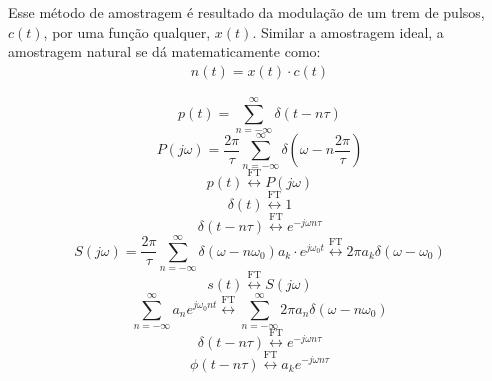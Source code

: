 Esse método de amostragem é resultado da modulação de um trem de pulsos, $c(t)$, por uma função qualquer, $x(t)$. Similar a amostragem ideal, a amostragem natural se dá matematicamente como:
\begin{align}
    n(t) = x(t) \cdot c(t)
\end{align}


\begin{equation}
    p(t) = \sum_{n=-\infty}^{\infty} \delta(t - n\tau)    
\end{equation}
    \begin{equation}
    P(j\omega) = \frac{2\pi}{\tau} \sum_{n=-\infty}^{\infty} \delta(\omega - n\frac{2\pi}{\tau})    
    \end{equation}
    \begin{equation}
    p(t) \overset{\text{FT}}{\longleftrightarrow} P(j\omega)     
    \end{equation}
    \begin{equation}
    \delta(t) \overset{\text{FT}}{\longleftrightarrow} 1        
    \end{equation}
    \begin{equation}
    \delta(t - n\tau) \overset{\text{FT}}{\longleftrightarrow} e^{-j\omega n \tau}        
    \end{equation}
    \begin{equation}
        S(j\omega) = \frac{2\pi}{\tau} \sum_{n=-\infty}^{\infty} \delta(\omega - n\omega_{0}) a_{k} \cdot e^{j\omega_{0}t} \overset{\text{FT}}{\longleftrightarrow} 2\pi a_{k}\delta(\omega-\omega_{0})
    \end{equation}
    \begin{equation}       
    s(t)\overset{\text{FT}}{\longleftrightarrow}S(j\omega)
    \end{equation}
    \begin{equation}
    \sum_{n=-\infty}^{\infty} a_{n}e^{j\omega_{0}nt} \overset{\text{FT}}{\longleftrightarrow} \sum_{n=-\infty}^{\infty} 2\pi a_{n}\delta(\omega-n\omega_{0})
            \end{equation}
            \begin{equation}
    \delta(t-n\tau) \overset{\text{FT}}{\longleftrightarrow} e^{-j\omega n\tau}              
            \end{equation}
\begin{equation}
    \phi(t-n\tau) \overset{\text{FT}}{\longleftrightarrow} a_{k}e^{-j\omega n\tau} 
\end{equation}

